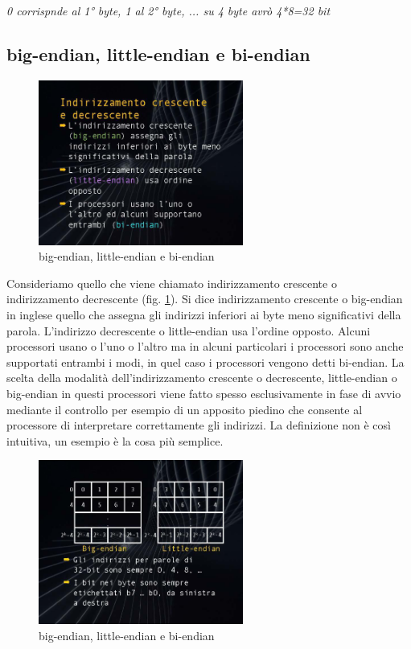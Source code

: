 \textit{0 corrispnde al 1° byte, 1 al 2° byte, ... su 4 byte avrò 4*8=32 bit}

\subsection{big-endian, little-endian e bi-endian}

\FloatBarrier
\begin{figure}[H]
  \centering
  \includegraphics[width=0.6\textwidth,
                    trim=40 40 45 40, %
                    clip]{images/Lez02_p03_fig_02.png}
  \caption{big-endian, little-endian e bi-endian}
  \label{fig:Lez02_p03_fig_02}
\end{figure}
\FloatBarrier
\noindent

Consideriamo quello che viene chiamato indirizzamento crescente o indirizzamento decrescente (fig. \ref{fig:Lez02_p03_fig_02}).
Si dice indirizzamento crescente o big-endian in inglese quello che assegna gli indirizzi inferiori ai byte meno significativi della parola. L'indirizzo decrescente o little-endian usa l'ordine opposto.
Alcuni processori usano o l'uno o l'altro ma in alcuni particolari i processori sono anche supportati entrambi i modi, in quel caso i processori vengono detti bi-endian.
La scelta della modalità dell'indirizzamento crescente o decrescente, little-endian o big-endian in questi processori viene fatto spesso esclusivamente in fase di avvio mediante il controllo per esempio di un apposito piedino che  consente al processore di interpretare correttamente gli indirizzi.
La definizione non è così intuitiva, un esempio è la cosa più semplice.

\FloatBarrier
\begin{figure}[H]
  \centering
  \includegraphics[width=0.6\textwidth,
                    trim=40 40 45 40, %
                    clip]{images/Lez02_p03_fig_03.png}
  \caption{big-endian, little-endian e bi-endian}
  \label{fig:Lez02_p03_fig_03}
\end{figure}
\FloatBarrier
\noindent

